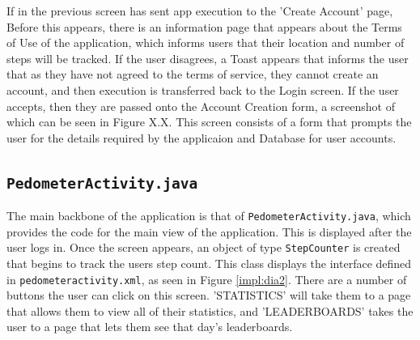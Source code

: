 \documentclass{l4proj}
\begin{document}
If in the previous screen has sent app execution to the 'Create Account' page, Before this appears, there is an information page that appears about the Terms of Use of the application, which informs users that their location and number of steps will be tracked. If the user disagrees, a Toast appears that informs the user that as they have not agreed to the terms of service, they cannot create an account, and then execution is transferred back to the Login screen. If the user accepts, then they are passed onto the Account Creation form, a screenshot of which can be seen in Figure X.X. This screen consists of a form that prompts the user for the details required by the applicaion and Database for user accounts. 

\subsection{\texttt{PedometerActivity.java}}

The main backbone of the application is that of \texttt{PedometerActivity.java}, which provides the code for the main view of the application. This is displayed after the user logs in. Once the screen appears, an object of type \texttt{StepCounter} is created that begins to track the users step count. This class displays the interface defined in \texttt{pedometeractivity.xml}, as seen in Figure \ref{impl:dia2}. There are a number of buttons the user can click on this screen. 'STATISTICS' will take them to a page that allows them to view all of their statistics, and 'LEADERBOARDS' takes the user to a page that lets them see that day's leaderboards. 
\end{document}
